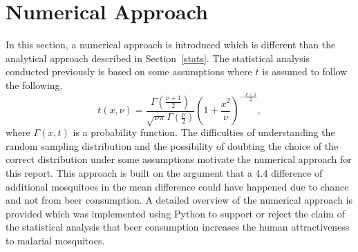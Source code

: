 \section{Numerical Approach}\label{computational}
In this section, a numerical approach is introduced which is different than the analytical approach described in Section~\ref{stats}. The statistical analysis conducted previously is based on some assumptions where $t$ is assumed to follow the following,
\begin{equation*}
  t(x,\nu) = \frac{\Gamma(\frac{\nu+1}{2})}{\sqrt{\nu\pi}\Gamma(\frac{\nu}{2})}\left(1 +\frac{x^2}{\nu} \right)^{-\frac{\nu+1}{2}},
\end{equation*}
where $\Gamma(x,t)$ is a probability function. The difficulties of understanding the random sampling distribution and the possibility of doubting the choice of the correct distribution under some assumptions motivate the numerical approach for this report. This approach is built on the argument that a 4.4 difference of additional mosquitoes in the mean difference could have happened due to chance and not from beer consumption. A detailed overview of the numerical approach is provided which was implemented using Python to support or reject the claim of the statistical analysis that beer consumption increases the human attractiveness to malarial mosquitoes.

